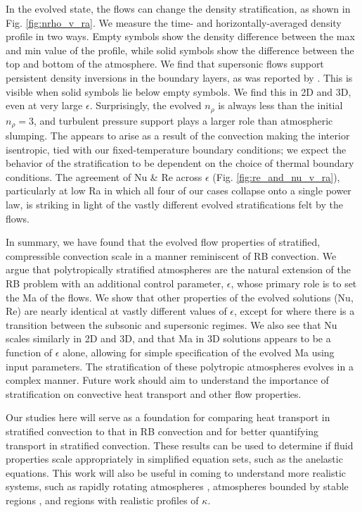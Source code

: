 \documentclass[aps, prl, twocolumn, nofootinbib, groupedaddress, amsfonts, amssymb, amsmath]{revtex4-1}
\begin{document}
In the evolved state, the flows can change the density stratification,
as shown in Fig. \ref{fig:nrho_v_ra}.
We measure the 
time- and horizontally-averaged density profile in two ways. Empty symbols
show the density difference
between the max and min value of the profile, while solid symbols
show the difference between the top and bottom of the atmosphere. 
We find that supersonic flows support persistent density inversions 
in the boundary layers, as
was reported by \cite{brandenburg&all2005}.  This is visible when
solid symbols lie below empty symbols.  We find this in 2D and 3D, even
at very large $\epsilon$.
Surprisingly, the evolved $n_\rho$ is always less than the initial $n_\rho = 3$,
and turbulent pressure support plays a larger role than atmospheric slumping.
The appears to arise as a result of the convection making the interior isentropic,
tied with our fixed-temperature boundary conditions; 
we expect the behavior of the stratification to be dependent on the choice of
thermal boundary conditions.
The agreement of Nu \& Re across $\epsilon$ (Fig. \ref{fig:re_and_nu_v_ra}), 
particularly at low Ra in which all four of our cases collapse onto a single
power law, is striking in light of the vastly different evolved stratifications
felt by the flows. 


In summary, we have found that the evolved flow properties of stratified,
compressible convection scale in a manner reminiscent of RB convection.
We argue that polytropically stratified atmospheres are the natural
extension of the RB problem with an additional control parameter, $\epsilon$,
whose primary role is to set the Ma of the flows.  We show that other properties
of the evolved solutions (Nu, Re) are nearly identical at vastly different values
of $\epsilon$, except for where there is a transition between the subsonic
and supersonic regimes.  We also see that Nu scales similarly in 2D and 3D,
and that Ma in 3D solutions appears to be a function of $\epsilon$ alone,
allowing for simple specification of the evolved Ma using input parameters.
The stratification of 
these polytropic atmospheres evolves in a complex
manner.  Future work should aim to 
understand the importance of stratification on
convective heat transport and other flow properties.

Our studies here will serve as a foundation for 
comparing heat transport in stratified convection
to that in RB convection \cite{johnston&doering2009}
and for better quantifying transport in stratified convection.  
These results can be used to determine if fluid properties
scale appropriately in simplified equation sets, 
such as the anelastic equations.
This work will also be useful in coming to understand more realistic systems, 
such as rapidly rotating atmospheres \cite{julien&all2012},
atmospheres bounded by stable regions \cite{hurlburt&all1986}, 
and regions with realistic profiles of $\kappa$.
\end{document}
